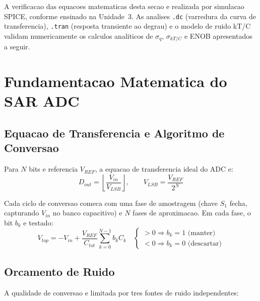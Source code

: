 \documentclass[12pt, a4paper]{article}
\begin{document}
\begin{unidadebox}
A verificacao das equacoes matematicas desta secao e realizada por simulacao SPICE, conforme
ensinado na Unidade~3. As analises \texttt{.dc} (varredura da curva de transferencia),
\texttt{.tran} (resposta transiente ao degrau) e o modelo de ruido kT/C validam numericamente
os calculos analiticos de $\sigma_q$, $\sigma_{kT/C}$ e ENOB apresentados a seguir.
\end{unidadebox}

\section{Fundamentacao Matematica do SAR ADC}

\subsection{Equacao de Transferencia e Algoritmo de Conversao}

Para $N$ bits e referencia $V_{REF}$, a equacao de transferencia ideal do ADC e:
\begin{equation}
  D_{out} = \left\lfloor \frac{V_{in}}{V_{LSB}} \right\rfloor, \qquad V_{LSB} = \frac{V_{REF}}{2^N}
  \label{eq:transfer}
\end{equation}

Cada ciclo de conversao comeca com uma fase de amostragem (chave $S_1$ fecha, capturando
$V_{in}$ no banco capacitivo) e $N$ fases de aproximacao. Em cada fase, o bit $b_k$ e testado:
\begin{equation}
  V_{top} = -V_{in} + \frac{V_{REF}}{C_{tot}} \sum_{k=0}^{N-1} b_k C_k \quad
  \begin{cases} > 0 \Rightarrow b_k = 1 \text{ (manter)} \\ < 0 \Rightarrow b_k = 0 \text{ (descartar)} \end{cases}
  \label{eq:vtop}
\end{equation}

\subsection{Orcamento de Ruido}

A qualidade de conversao e limitada por tres fontes de ruido independentes:
\end{document}
